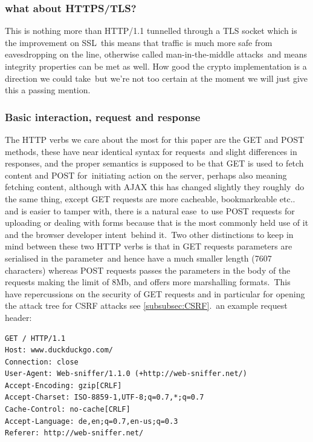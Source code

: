 \documentclass[a4paper,12pt]{paper}
\begin{document}
\subsubsection{what about HTTPS/TLS?}

This is nothing more than HTTP/1.1 tunnelled through a TLS socket which is the improvement on SSL\
this means that traffic is much more safe from eavesdropping on the line, otherwise called man-in-the-middle attacks\
and means integrity properties can be met as well. How good the crypto implementation is a direction we could take\
but we're not too certain at the moment we will just give this a passing mention.\\

\subsubsection{Basic interaction, request and response}

The HTTP verbs we care about the most for this paper are the GET and POST methods, these have near identical syntax for requests\
and slight differences in responses, and the proper semantics is supposed to be that GET is used to fetch content and POST for\
initiating action on the server, perhaps also meaning fetching content, although with AJAX this has changed slightly they roughly\
do the same thing, except GET requests are more cacheable, bookmarkeable etc.. and is easier to tamper with, there is a natural ease\
to use POST requests for uploading or dealing with forms because that is the most commonly held use of it and the browser developer intent\
behind it.\ Two other distinctions to keep in mind between these two HTTP verbs is that in GET requests parameters are serialised in the parameter\
and hence have a much smaller length (7607 characters) whereas POST requests passes the parameters in the body of the requests making the limit of 8Mb, and offers more marshalling formats.\
This have repercussions on the security of GET requests and in particular for opening the attack tree for CSRF attacks see \ref{subsubsec:CSRF}.\
an example request header:\\

\begin{verbatim}
GET / HTTP/1.1
Host: www.duckduckgo.com/
Connection: close
User-Agent: Web-sniffer/1.1.0 (+http://web-sniffer.net/)
Accept-Encoding: gzip[CRLF]
Accept-Charset: ISO-8859-1,UTF-8;q=0.7,*;q=0.7
Cache-Control: no-cache[CRLF]
Accept-Language: de,en;q=0.7,en-us;q=0.3
Referer: http://web-sniffer.net/
\end{verbatim}
\end{document}
